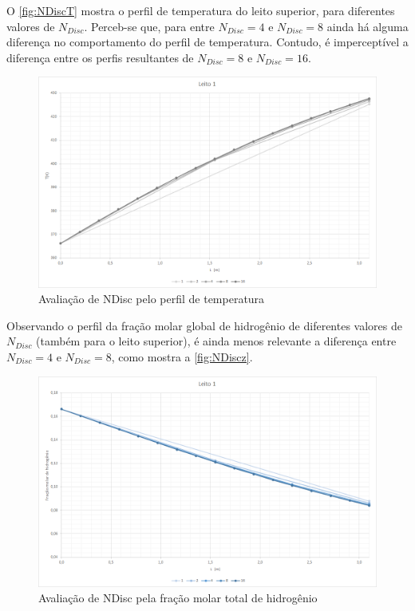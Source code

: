 O \autoref{fig:NDiscT} mostra o perfil de temperatura do leito superior, para
diferentes valores de $N_{Disc}$. Perceb-se que, para entre $N_{Disc} = 4$ e
$N_{Disc} = 8$ ainda há alguma diferença no comportamento do perfil de
temperatura. Contudo, é imperceptível a diferença entre os perfis resultantes de
$N_{Disc} = 8$ e $N_{Disc} = 16$. 

\begin{figure}[htb] \centering
\includegraphics[scale=0.4]{images/Chap4/NDiscT.png}
\caption{Avaliação de NDisc pelo perfil de temperatura}
\label{fig:NDiscT}
\end{figure}

Observando o perfil da fração molar global de hidrogênio de diferentes valores
de $N_{Disc}$ (também para o leito superior), é ainda menos relevante a
diferença entre $N_{Disc} = 4$ e $N_{Disc} = 8$, como mostra a
\autoref{fig:NDiscz}.

\begin{figure}[htb]
\centering \includegraphics[scale=0.4]{images/Chap4/NDiscz.png}
\caption{Avaliação de NDisc pela fração molar total de hidrogênio}
\label{fig:NDiscz}
\end{figure}

